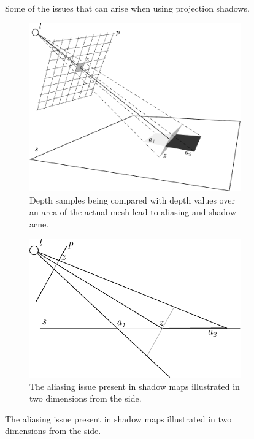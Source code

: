 \begin{figure}[h]
    \caption{Some of the issues that can arise when using projection shadows.}
    \label{fig:shadow_mapping_issues}
\end{figure}

\begin{figure}
	\centering
	\begin{subfigure}{0.7\textwidth}
        \includegraphics[width=\textwidth]{./graf/shadow_mapping_acne.pdf}
        \caption{Depth samples being compared with depth values over an area of the actual mesh lead to aliasing and shadow acne.}
        \label{fig:shadow_mapping_acne_explanation_3d}
    \end{subfigure}
	\begin{subfigure}{0.7\textwidth}
        \includegraphics[width=\textwidth]{./graf/shadow_mapping_acne_side.pdf}
        \caption{The aliasing issue present in shadow maps illustrated in two dimensions from the side.}
        \label{fig:shadow_mapping_acne_explanation_side}
    \end{subfigure}


\end{figure}
